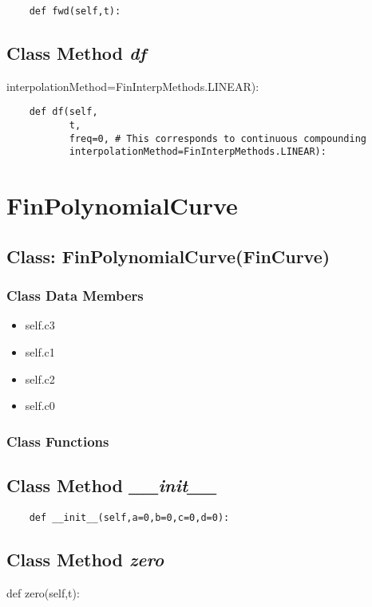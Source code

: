 \documentclass[twoside,11pt]{book}
\begin{document}
\begin{lstlisting}
    def fwd(self,t):
\end{lstlisting}

\subsection{Class Method {\it df}}
interpolationMethod=FinInterpMethods.LINEAR):

\begin{lstlisting}
    def df(self,
           t, 
           freq=0, # This corresponds to continuous compounding
           interpolationMethod=FinInterpMethods.LINEAR):
\end{lstlisting}

\newpage
\section{FinPolynomialCurve}

\subsection{Class: FinPolynomialCurve(FinCurve)}


\subsubsection{Class Data Members}
\begin{itemize}
\item{self.c3}
\item{self.c1}
\item{self.c2}
\item{self.c0}
\end{itemize}

\subsubsection{Class Functions}

\subsection{Class Method {\it \_\_init\_\_}}


\begin{lstlisting}
    def __init__(self,a=0,b=0,c=0,d=0):
\end{lstlisting}

\subsection{Class Method {\it zero}}
def zero(self,t):
\end{document}
